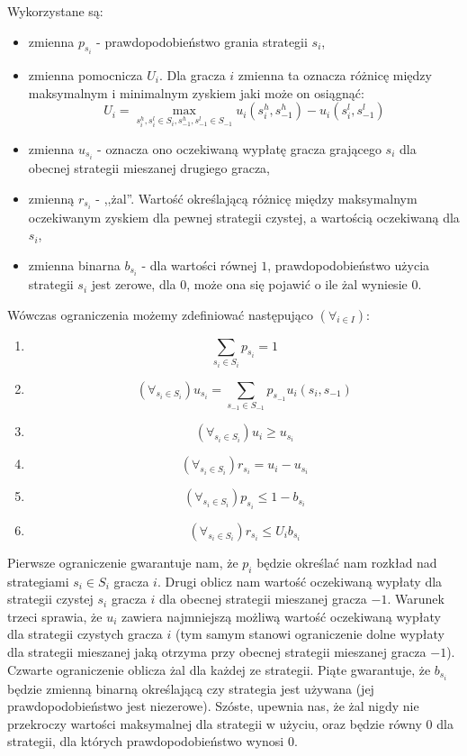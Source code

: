 \documentclass[polish]{standalone}
\begin{document}
Wykorzystane są: 
\begin{itemize}
\item zmienna $p_{s_i}$ - prawdopodobieństwo grania strategii $s_i$,
\item zmienna pomocnicza $U_i$. Dla gracza $i$ zmienna ta oznacza różnicę między maksymalnym i minimalnym zyskiem jaki
może on osiągnąć:
$$U_i = \max_{s_i^h, s_i^l \in S_i, s_{-1}^h, s_{-1}^l \in S_{-1}} u_i(s_i^h, s_{-1}^h) - u_i(s_i^l, s_{-1}^l)$$
\item zmienna $u_{s_i}$ - oznacza ono oczekiwaną wypłatę gracza grającego $s_i$ dla obecnej strategii mieszanej drugiego
gracza,
\item zmienną $r_{s_i}$ - ,,żal''. Wartość określającą różnicę między maksymalnym oczekiwanym zyskiem dla pewnej
strategii czystej, a wartością oczekiwaną dla $s_i$,
\item zmienna binarna $b_{s_i}$ - dla wartości równej $1$, prawdopodobieństwo użycia strategii $s_i$ jest zerowe,
dla $0$, może ona się pojawić o ile żal wyniesie $0$.
\end{itemize}

Wówczas ograniczenia możemy zdefiniować następująco $(\forall_{i \in I})$:
\begin{enumerate}
\item $$\sum_{{s_i} \in S_i} p_{s_i} = 1$$
\item $$(\forall_{s_i \in S_i}) u_{s_i} = \sum_{s_{-1} \in S_{-1}} p_{s_{-1}} u_i(s_i, s_{-1})$$
\item $$(\forall_{s_i \in S_i}) u_i \geq u_{s_i}$$
\item $$(\forall_{s_i \in S_i}) r_{s_i} = u_i - u_{s_i}$$
\item $$(\forall_{s_i \in S_i}) p_{s_i} \leq 1-b_{s_i}$$
\item $$(\forall_{s_i \in S_i}) r_{s_i} \leq U_i b_{s_i}$$
\end{enumerate}

Pierwsze ograniczenie gwarantuje nam, że $p_i$ będzie określać nam rozkład nad strategiami $s_i \in S_i$ gracza $i$.
Drugi oblicz nam wartość oczekiwaną wypłaty dla strategii czystej $s_i$ gracza $i$ dla obecnej strategii mieszanej
gracza $-1$. Warunek trzeci sprawia, że $u_i$ zawiera najmniejszą możliwą wartość oczekiwaną wypłaty dla strategii
czystych gracza $i$ (tym samym stanowi ograniczenie dolne wypłaty dla strategii mieszanej jaką otrzyma przy obecnej
strategii mieszanej gracza $-1$). Czwarte ograniczenie oblicza żal dla każdej ze strategii. Piąte gwarantuje, że
$b_{s_i}$ będzie zmienną binarną określającą czy strategia jest używana (jej prawdopodobieństwo jest niezerowe). Szóste,
upewnia nas, że żal nigdy nie przekroczy wartości maksymalnej dla strategii w użyciu, oraz będzie równy 0 dla strategii,
dla których prawdopodobieństwo wynosi 0.
\end{document}
